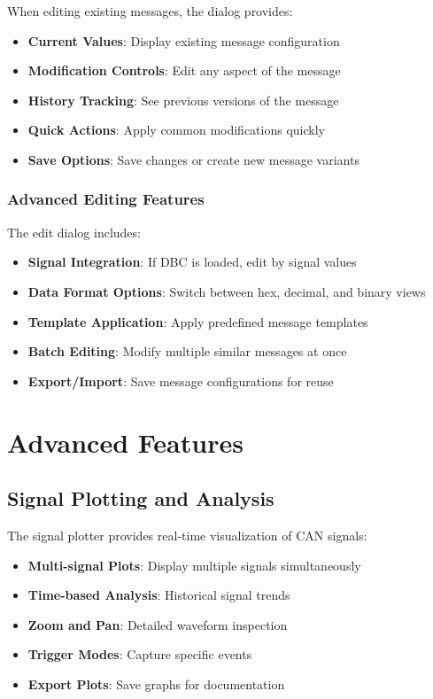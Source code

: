 \documentclass[11pt,a4paper]{article}
\begin{document}
When editing existing messages, the dialog provides:

\begin{itemize}
    \item \textbf{Current Values}: Display existing message configuration
    \item \textbf{Modification Controls}: Edit any aspect of the message
    \item \textbf{History Tracking}: See previous versions of the message
    \item \textbf{Quick Actions}: Apply common modifications quickly
    \item \textbf{Save Options}: Save changes or create new message variants
\end{itemize}

\subsubsection{Advanced Editing Features}

The edit dialog includes:

\begin{itemize}
    \item \textbf{Signal Integration}: If DBC is loaded, edit by signal values
    \item \textbf{Data Format Options}: Switch between hex, decimal, and binary views
    \item \textbf{Template Application}: Apply predefined message templates
    \item \textbf{Batch Editing}: Modify multiple similar messages at once
    \item \textbf{Export/Import}: Save message configurations for reuse
\end{itemize}

\section{Advanced Features}

\subsection{Signal Plotting and Analysis}

The signal plotter provides real-time visualization of CAN signals:

\begin{itemize}
    \item \textbf{Multi-signal Plots}: Display multiple signals simultaneously
    \item \textbf{Time-based Analysis}: Historical signal trends
    \item \textbf{Zoom and Pan}: Detailed waveform inspection
    \item \textbf{Trigger Modes}: Capture specific events
    \item \textbf{Export Plots}: Save graphs for documentation
\end{itemize}
\end{document}
